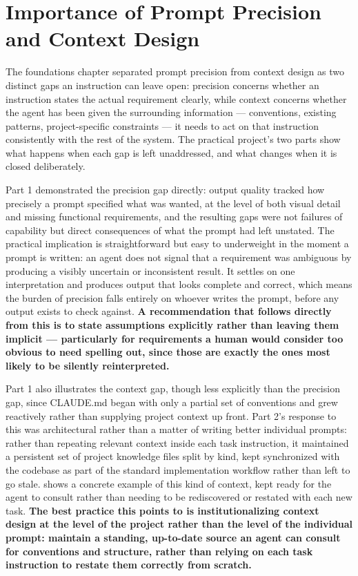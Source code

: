 \section{Importance of Prompt Precision and Context Design}

The foundations chapter separated prompt precision from context design as two distinct gaps an instruction can leave open: precision concerns whether an instruction states the actual requirement clearly, while context concerns whether the agent has been given the surrounding information --- conventions, existing patterns, project-specific constraints --- it needs to act on that instruction consistently with the rest of the system. The practical project's two parts show what happens when each gap is left unaddressed, and what changes when it is closed deliberately.

Part 1 demonstrated the precision gap directly: output quality tracked how precisely a prompt specified what was wanted, at the level of both visual detail and missing functional requirements, and the resulting gaps were not failures of capability but direct consequences of what the prompt had left unstated. The practical implication is straightforward but easy to underweight in the moment a prompt is written: an agent does not signal that a requirement was ambiguous by producing a visibly uncertain or inconsistent result. It settles on one interpretation and produces output that looks complete and correct, which means the burden of precision falls entirely on whoever writes the prompt, before any output exists to check against. \textbf{A recommendation that follows directly from this is to state assumptions explicitly rather than leaving them implicit --- particularly for requirements a human would consider too obvious to need spelling out, since those are exactly the ones most likely to be silently reinterpreted.}

Part 1 also illustrates the context gap, though less explicitly than the precision gap, since CLAUDE.md began with only a partial set of conventions and grew reactively rather than supplying project context up front. Part 2's response to this was architectural rather than a matter of writing better individual prompts: rather than repeating relevant context inside each task instruction, it maintained a persistent set of project knowledge files split by kind, kept synchronized with the codebase as part of the standard implementation workflow rather than left to go stale.  shows a concrete example of this kind of context, kept ready for the agent to consult rather than needing to be rediscovered or restated with each new task. \textbf{The best practice this points to is institutionalizing context design at the level of the project rather than the level of the individual prompt: maintain a standing, up-to-date source an agent can consult for conventions and structure, rather than relying on each task instruction to restate them correctly from scratch.}

